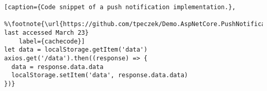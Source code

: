 \begin{minipage}
    \begin{lstlisting}[caption={Code snippet of a push notification implementation.},
    %\footnote{\url{https://github.com/tpeczek/Demo.AspNetCore.PushNotifications/blob/main/Demo.AspNetCore.PushNotifications.Services.PushService/PushServicePushNotificationService.cs} last accessed March 23}
    label={cachecode}]
let data = localStorage.getItem('data')
axios.get('/data').then((response) => {
  data = response.data.data
  localStorage.setItem('data', response.data.data)
})}
\end{lstlisting}
\end{minipage}